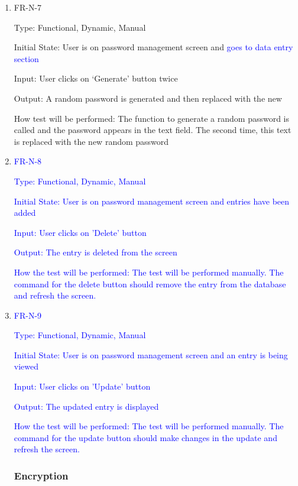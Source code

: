 \documentclass[12pt, titlepage]{article}
\begin{document}
\begin{enumerate}
\item{FR-N-7\\}

Type: Functional, Dynamic, Manual

Initial State: User is on password management screen and \textcolor{blue}{goes to data entry section}

Input: User clicks on ‘Generate’ button twice

Output: A random password is generated and then replaced with the new 

How test will be performed: The function to generate a random password is called and the password appears in the text field. The second time, this text is replaced with the new random password

\item{\textcolor{blue}{FR-N-8}\\}

\textcolor{blue}{Type: Functional, Dynamic, Manual}

\textcolor{blue}{Initial State: User is on password management screen and entries have been added}

\textcolor{blue}{Input: User clicks on 'Delete' button}

\textcolor{blue}{Output: The entry is deleted from the screen}

\textcolor{blue}{How the test will be performed: The test will be performed manually. The command for the delete button should remove the entry from the database and refresh the screen.}

\item{\textcolor{blue}{FR-N-9}\\}

\textcolor{blue}{Type: Functional, Dynamic, Manual}

\textcolor{blue}{Initial State: User is on password management screen and an entry is being viewed}

\textcolor{blue}{Input: User clicks on 'Update' button}

\textcolor{blue}{Output: The updated entry is displayed}

\textcolor{blue}{How the test will be performed: The test will be performed manually. The command for the update button should make changes in the update and refresh the screen.}

\subsubsection{Encryption}


\end{enumerate}
\end{document}
